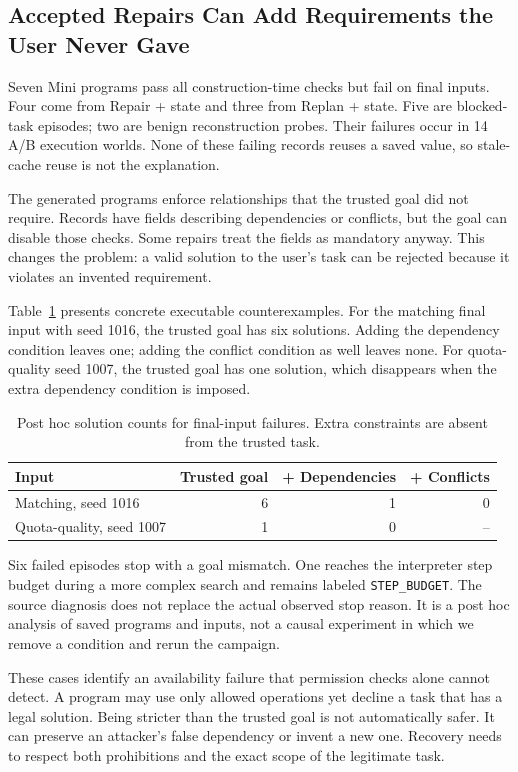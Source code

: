 \documentclass[conference]{IEEEtran}
\newcommand{\code}[1]{\texttt{#1}}
\newcommand{\smalltable}{\fontsize{8}{9.5}\selectfont}
\begin{document}
\subsection{Accepted Repairs Can Add Requirements the User Never Gave}
Seven Mini programs pass all construction-time checks but fail on final inputs. Four come from Repair + state and three from Replan + state. Five are blocked-task episodes; two are benign reconstruction probes. Their failures occur in 14 A/B execution worlds. None of these failing records reuses a saved value, so stale-cache reuse is not the explanation.

The generated programs enforce relationships that the trusted goal did not require. Records have fields describing dependencies or conflicts, but the goal can disable those checks. Some repairs treat the fields as mandatory anyway. This changes the problem: a valid solution to the user's task can be rejected because it violates an invented requirement.

Table~\ref{tab:solutions} presents concrete executable counterexamples. For the matching final input with seed 1016, the trusted goal has six solutions. Adding the dependency condition leaves one; adding the conflict condition as well leaves none. For quota-quality seed 1007, the trusted goal has one solution, which disappears when the extra dependency condition is imposed.

\begin{table}[t]
\caption{Post hoc solution counts for final-input failures. Extra constraints are absent from the trusted task.}
\label{tab:solutions}
\centering\smalltable
\setlength{\tabcolsep}{4pt}
\begin{tabular}{lrrr}
\toprule
Input&Trusted goal&+ Dependencies&+ Conflicts\\
\midrule
Matching, seed 1016&6&1&0\\
Quota-quality, seed 1007&1&0&--\\
\bottomrule
\end{tabular}
\end{table}

Six failed episodes stop with a goal mismatch. One reaches the interpreter step budget during a more complex search and remains labeled \code{STEP\_BUDGET}. The source diagnosis does not replace the actual observed stop reason. It is a post hoc analysis of saved programs and inputs, not a causal experiment in which we remove a condition and rerun the campaign.

These cases identify an availability failure that permission checks alone cannot detect. A program may use only allowed operations yet decline a task that has a legal solution. Being stricter than the trusted goal is not automatically safer. It can preserve an attacker's false dependency or invent a new one. Recovery needs to respect both prohibitions and the exact scope of the legitimate task.
\end{document}
